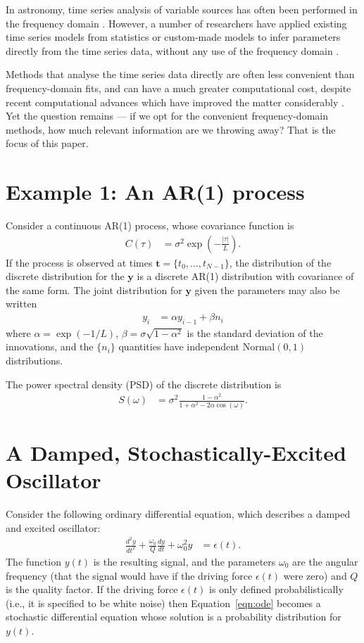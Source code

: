 \documentclass[a4paper, 12pt]{article}
\begin{document}
In astronomy, time series analysis of variable sources has often been performed
in the frequency domain \citep[e.g.][]{lomb, hatzes, helio}. However,
a number of researchers have applied existing time series models from
statistics \citep{brockwell_davis} or custom-made models to infer parameters
directly from the time series data, without any use of the frequency domain
\citep[e.g.][]{gregory_loredo, gregory, kelly, brewer_stello, farr, edwards}.

Methods that analyse the time series data directly are often less convenient
than frequency-domain fits, and can have a much greater computational cost,
despite recent computational advances which have improved the matter
considerably \citep[e.g.][]{hodlr, celerite}. Yet the question remains ---
if we opt for the convenient frequency-domain methods, how much relevant
information are we throwing away? That is the focus of this paper.

\section{Example 1: An AR(1) process}
Consider a continuous AR(1) process, whose covariance function is
\begin{align}
C(\tau) &= \sigma^2 \exp\left(-\frac{|\tau|}{L}\right).
\end{align}
If the process is observed at times $\boldsymbol{t} = \{t_0, ..., t_{N-1}\}$,
the distribution of the discrete distribution for the $\boldsymbol{y}$
is a discrete AR(1) distribution with covariance of the same form.
The joint distribution for $\boldsymbol{y}$ given the parameters
may also be written
\begin{align}
y_i &= \alpha y_{i-1} + \beta n_i
\end{align}
where $\alpha = \exp(-1/L)$, $\beta=\sigma\sqrt{1-\alpha^2}$
is the standard deviation of the
innovations, and the $\{n_i\}$ quantities have independent Normal$(0, 1)$
distributions.

The power spectral density (PSD) of the discrete distribution is
\begin{align}
S(\omega) &= \sigma^2\frac{1 - \alpha^2}{1 + \alpha^2 - 2\alpha\cos(\omega)}.
\end{align}


\section{A Damped, Stochastically-Excited Oscillator}
Consider the following ordinary differential equation, which describes
a damped and excited oscillator:
\begin{align}
\frac{d^2y}{dt^2} + \frac{\omega_0}{Q}\frac{dy}{dt}
        + \omega_0^2y &= \epsilon(t).\label{eqn:ode}
\end{align}
The function $y(t)$ is the resulting signal, and the parameters $\omega_0$
are the angular frequency (that the signal would have if
the driving force $\epsilon(t)$ were zero) and $Q$ is the quality factor.
If the driving force $\epsilon(t)$ is only defined probabilistically (i.e.,
it is specified to be white noise) then Equation~\ref{eqn:ode} becomes a
stochastic differential equation whose solution is a probability distribution
for $y(t)$.
\end{document}
